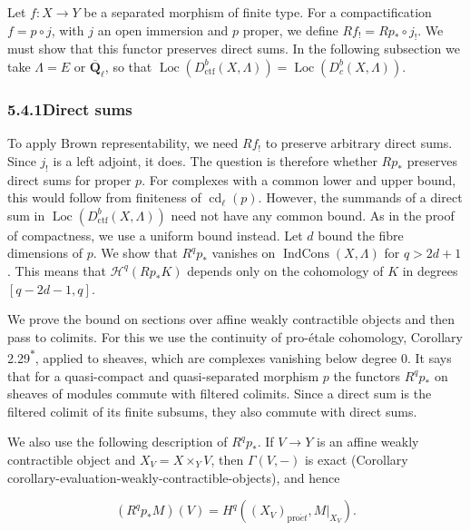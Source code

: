 \documentclass[11pt]{article}
\newcommand{\bpout}[1]{#1\textsuperscript{\hyperlink{bp-outside}{\ensuremath{\ast}}}}
\providecommand{\Dbc}{}\renewcommand{\Dbc}{D^b_c}
\providecommand{\IndCons}{}\renewcommand{\IndCons}{\operatorname{IndCons}}
\providecommand{\Loc}{}\renewcommand{\Loc}{\operatorname{Loc}}
\begin{document}
Let \(f:X\to Y\) be a separated morphism of finite type. For a compactification \(f=p\circ j\), with \(j\) an open immersion and \(p\) proper, we define \(Rf_!=Rp_*\circ j_!\). We must show that this functor preserves direct sums. In the following subsection we take \(\Lambda=E\) or \(\overline{\mathbf Q}_\ell\), so that \(\Loc(D^b_{\mathrm{ctf}}(X,\Lambda))=\Loc(\Dbc(X,\Lambda))\).

\subsubsection*{\texorpdfstring{5.4.1\quad Direct sums}{5.4.1 Direct sums}}
\label{bp55}%
\label{bp56}%
To apply Brown representability, we need \(Rf_!\) to preserve arbitrary direct sums. Since \(j_!\) is a left adjoint, it does. The question is therefore whether \(Rp_*\) preserves direct sums for proper \(p\). For complexes with a common lower and upper bound, this would follow from finiteness of \(\operatorname{cd}_\ell(p)\). However, the summands of a direct sum in \(\Loc(D^b_{\mathrm{ctf}}(X,\Lambda))\) need not have any common bound. As in the proof of compactness, we use a uniform bound instead. Let \(d\) bound the fibre dimensions of \(p\). We show that \(R^qp_*\) vanishes on \(\IndCons(X,\Lambda)\) for \(q>2d+1\). This means that \(\mathcal H^q(Rp_*K)\) depends only on the cohomology of \(K\) in degrees \([q-2d-1,q]\).

We prove the bound on sections over affine weakly contractible objects and then pass to colimits. For this we use the continuity of pro-étale cohomology, Corollary \bpout{2.29}, applied to sheaves, which are complexes vanishing below degree \(0\). It says that for a quasi-compact and quasi-separated morphism \(p\) the functors \(R^qp_*\) on sheaves of modules commute with filtered colimits. Since a direct sum is the filtered colimit of its finite subsums, they also commute with direct sums.

We also use the following description of \(R^qp_*\). If \(V\to Y\) is an affine weakly contractible object and \(X_V=X\times_YV\), then \(\Gamma(V,-)\) is exact (Corollary corollary-evaluation-weakly-contractible-objects), and hence

\[
(R^qp_*M)(V)=H^q((X_V)_{\mathrm{pro}\acute{e}t},M|_{X_V}).
\tag{5.5}
\]
\end{document}
